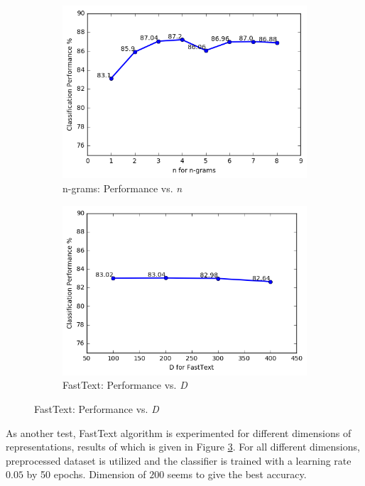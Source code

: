 \begin{figure}[h!]
	\centering
	\begin{subfigure}{0.48\columnwidth}
		\centering
		\includegraphics[width=\linewidth]{ngrams.png}
		\caption{n-grams: Performance vs. \textit{n}}
		\label{fig:perf_ngrams}
	\end{subfigure}
	\begin{subfigure}{0.48\columnwidth}
		\centering
		\includegraphics[width=\linewidth]{fasttext.png}
		\caption{FastText: Performance vs. \textit{D}}
		\label{fig:perf_ft}
	\end{subfigure}
\end{figure}


As another test, FastText algorithm is experimented for different dimensions of representations, results of which is given in Figure \ref{fig:perf_ft}.
For all different dimensions, preprocessed dataset is utilized and the classifier is trained with a learning rate $0.05$ by 50 epochs.
Dimension of $200$ seems to give the best accuracy.

